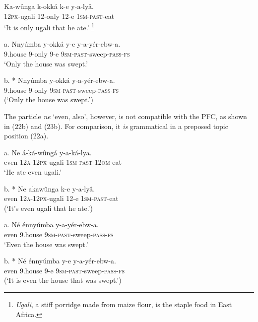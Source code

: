 \documentclass[output=paper]{langsci/langscibook}
\begin{document}
\ea
\gll   Ka-wûnga  k-okká    k-e  y-a-lyâ.{ }\\
       \textsc{12px}{}-ugali  12-only  12-e  \textsc{1sm}{}-\textsc{past}{}-eat\\
\glt   ‘It is only ugali that he ate.’{ }\footnote{ \textit{Ugali}, a stiff porridge made from maize flour, is the staple food in East Africa.}
\z

\ea
\gll   a.  Nnyúmba  y-okká  y-e  y-a-yér-ebw-a.\\
         9.house  9-only  9-e  \textsc{9sm}{}-\textsc{past}{}-sweep-\textsc{pass}{}-\textsc{fs}\\
\glt     ‘Only the house was swept.’
\z

\ea
\gll   b.  * Nnyúmba  y-okká    y-a-yér-ebw-a.\\
         9.house  9-only    \textsc{9sm}{}-\textsc{past}{}-sweep-\textsc{pass}{}-\textsc{fs}\\
\glt     (‘Only the house was swept.’)
\z

The particle \textit{ne} ‘even, also’, however, is not compatible with the PFC, as shown in (22b) and (23b). For comparison, it \textit{is} grammatical in a preposed topic position (22a).

\ea
\gll   a.  Ne  á-ká-wûngá    y-a-ká-lya.\\
         even  \textsc{12a}{}-\textsc{12px}{}-ugali  \textsc{1sm}{}-\textsc{past}{}-\textsc{12om}{}-eat\\
\glt     ‘He ate even ugali.’
\z

\ea
\gll   b.  * Ne  akawûnga    k-e  y-a-lyâ.\\
         even  \textsc{12a}{}-\textsc{12px}{}-ugali  12-e  \textsc{1sm}{}-\textsc{past}{}-eat\\
\glt     (‘It’s even ugali that he ate.’)
\z

\ea
\gll   a.  Né  énnyúmba  y-a-yér-ebw-a.\\
         even  9.house  \textsc{9sm}{}-\textsc{past}{}-sweep-\textsc{pass}{}-\textsc{fs}\\
\glt     ‘Even the house was swept.’
\z

\ea
\gll   b.  * Né  énnyúmba  y-e  y-a-yér-ebw-a.\\
         even  9.house  9-e  \textsc{9sm}{}-\textsc{past}{}-sweep-\textsc{pass}{}-\textsc{fs}\\
\glt     (‘It is even the house that was swept.’)
\z
\end{document}
